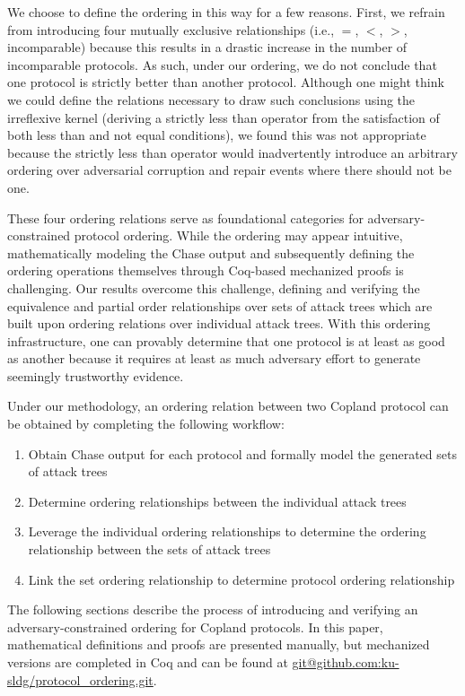 \documentclass[runningheads]{llncs}
\theoremstyle{definition}
\newcommand{\squash}{\itemsep=0pt\parskip=0pt}
\begin{document}
\noindent We choose to define the ordering in this way for a few reasons. First, we refrain from introducing four mutually exclusive relationships (i.e., $=$, $<$, $>$, incomparable) because this results in a drastic increase in the number of incomparable protocols. As such, under our ordering, we do not conclude that one protocol is strictly better than another protocol. Although one might think we could define the relations necessary to draw such conclusions using the irreflexive kernel (deriving a strictly less than operator from the satisfaction of both less than and not equal conditions), we found this was not appropriate because the strictly less than operator would inadvertently introduce an arbitrary ordering over adversarial corruption and repair events where there should not be one.  


These four ordering relations serve as foundational categories for adversary-constrained protocol ordering. While the ordering may appear intuitive, mathematically modeling the Chase output and subsequently defining the ordering operations themselves through Coq-based mechanized proofs is challenging. Our results overcome this challenge, defining and verifying the equivalence and partial order relationships over sets of attack trees which are built upon ordering relations over individual attack trees. With this ordering infrastructure, one can provably determine that one protocol is at least as good as another because it requires at least as much adversary effort to generate seemingly trustworthy evidence. 

Under our methodology, an ordering relation between two Copland protocol can be obtained by completing the following workflow:

\begin{enumerate}
    \squash
    \item Obtain Chase output for each protocol and formally model the generated sets of attack trees
    \item Determine ordering relationships between the individual attack trees
    \item Leverage the individual ordering relationships to determine the ordering relationship between the sets of attack trees
    \item Link the set ordering relationship to determine protocol ordering relationship
\end{enumerate}

The following sections describe the process of introducing and verifying an adversary-constrained ordering for Copland protocols. In this paper, mathematical definitions and proofs are presented manually, but mechanized versions are completed in Coq and can be found at \url{git@github.com:ku-sldg/protocol_ordering.git}.
\end{document}
